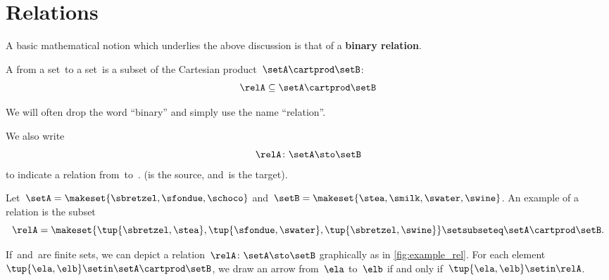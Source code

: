 
\section{Relations}
\label{sec:connection-relations}

A basic mathematical notion which underlies the above discussion is that of a \textbf{binary relation}.

\begin{ctdefinition}
    \label{def:binary-relation}
    A  \relA from a set~\setA to a set~\setB is a subset of the Cartesian product~$\setA\cartprod \setB$:
    \begin{equation}
        \relA \subseteq \setA \cartprod \setB
    \end{equation}
\end{ctdefinition}

We will often drop the word ``binary'' and simply use the name ``relation''.

We also write
\begin{equation}
    \relA \colon \setA \sto \setB
\end{equation}
to indicate a relation from~\setA to~\setB.
(\setA is the source, and~\setB is the target).

\begin{marginfigure}
    \centering
    \caption{}
    \label{fig:example_rel}
\end{marginfigure}

\begin{example}
    \label{exa:simple-rel}
    Let~$\setA = \makeset{ \sbretzel, \sfondue, \schoco}$ and~$\setB = \makeset{ \stea, \smilk, \swater, \swine }$.
    An example of a relation is the subset
    \begin{equation}
        \relA = \makeset{ \tup{\sbretzel, \stea}, \tup{\sfondue, \swater}, \tup{\sbretzel, \swine} } \setsubseteq \setA \cartprod \setB.
    \end{equation}
\end{example}

If~\setA and~\setB are finite sets, we can depict a relation~$\relA \colon \setA \sto \setB$ graphically as in \cref{fig:example_rel}.
For each element~$\tup{\ela,\elb} \setin \setA \cartprod \setB$, we draw an arrow from~$\ela$ to~$\elb$ if and only if~$\tup{\ela,\elb} \setin \relA$.

